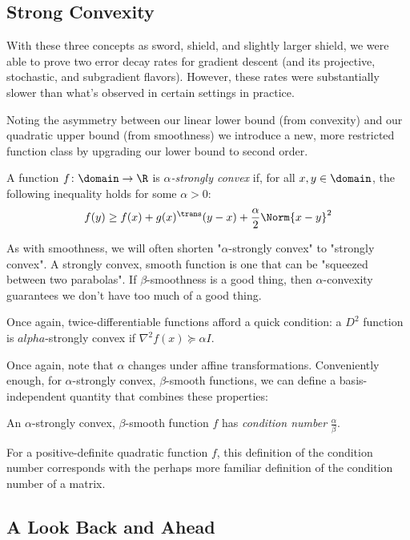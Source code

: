 \subsection{Strong Convexity}

With these three concepts as sword,
shield, and slightly larger shield,
we were able to prove two error decay rates for gradient descent
(and its projective, stochastic, and subgradient flavors).
However, these rates were substantially slower than
what's observed in certain settings in practice.

Noting the asymmetry between our linear lower bound
(from convexity)
and our quadratic upper bound
(from smoothness)
we introduce a new, more restricted function class
by upgrading our lower bound to second order.

\begin{definition}
A function $f\colon\domain\to\R$
is \emph{$\alpha$-strongly convex}
if, for all $x,y\in\domain$,
the following inequality holds
for some $\alpha>0$:
\[
f(y) \geq f(x) + g(x)^\trans(y-x) + \frac{\alpha}{2}\Norm{x-y}^2
\]
\end{definition}

As with smoothness,
we will often shorten "$\alpha$-strongly convex"
to "strongly convex".
A strongly convex, smooth function is one that can be
"squeezed between two parabolas".
If $\beta$-smoothness is a good thing,
then $\alpha$-convexity guarantees
we don't have too much of a good thing.

Once again,
twice-differentiable functions afford
a quick condition:
a $D^2$ function is $alpha$-strongly convex
if $\nabla^2f(x) \succeq \alpha I$.

Once again, note that $\alpha$ changes
under affine transformations.
Conveniently enough,
for $\alpha$-strongly convex, $\beta$-smooth
functions,
we can define a basis-independent 
quantity that combines these properties:

\begin{definition}
An $\alpha$-strongly convex,
$\beta$-smooth function $f$
has \emph{condition number} $\frac{\alpha}{\beta}$.
\end{definition}

For a positive-definite quadratic function $f$,
this definition of the condition number
corresponds with the perhaps more familiar
definition of the condition number of a matrix.

\newpage
\subsection{A Look Back and Ahead}

